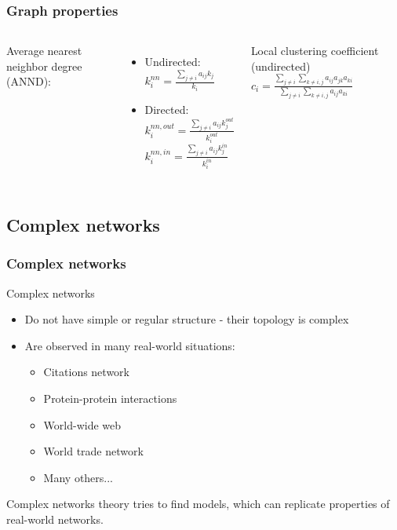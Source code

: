 \documentclass{beamer}
\begin{document}
\begin{frame}
\frametitle{Graph properties}  

\begin{columns}[t]
    Average nearest neighbor degree (ANND): 
    \begin{itemize}
        \item Undirected:  $k_{i}^{nn} = \frac{\sum_{j\neq i}a_{ij} k_j}{k_i}$
        \item Directed:
        \hspace{10px} $k_{i}^{nn,out} = \frac{\sum_{j\neq i}a_{ij} k_j^{out}}{k_i^{out}}$ \\
        \hspace{10px}$k_{i}^{nn,in} = \frac{\sum_{j\neq i}a_{ij} k_j^{in}}{k_i^{in}}$
    \end{itemize}
     Local clustering coefficient (undirected)
     $c_i = \frac{\sum_{j\neq i}\sum_{k\neq i,j}a_{ij} a_{jk} a_{ki}}{\sum_{j\neq i}\sum_{k\neq i,j}a_{ij}a_{ki}}$
\end{columns} 

\end{frame}

\subsection{Complex networks}
\begin{frame}
\frametitle{Complex networks}  
Complex networks
\begin{itemize}
    \item Do not have simple or regular structure - their topology is complex
    \item Are observed in many real-world situations:
    \begin{itemize}
        \item Citations network
        \item Protein-protein interactions
        \item World-wide web
        \item World trade network
        \item Many others...
    \end{itemize}
\end{itemize}

Complex networks theory tries to find models, which can replicate properties of real-world networks.

\end{frame}
\end{document}
